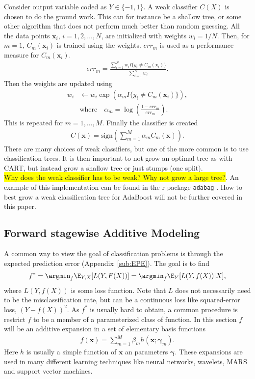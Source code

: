 Consider output variable coded as $Y \in \{-1, 1\}$. A weak classifier $C(X)$ is chosen to do the ground work. This can for instance be a shallow tree, or some other algorithm that does not perform much better than random guessing. All the data points $\mathbf{x}_i$, $i = 1, 2, \ldots, N$, are initialized with weights $w_i = 1/N$. Then, for $m = 1$, $C_m(\mathbf{x}_i)$ is trained using the weights. $err_m$ is used as a performance measure for $C_m(\mathbf{x}_i)$.
\begin{align}
  err_m =  \frac{\sum^{N}_{i=1} w_i I\{y_i \neq C_m(\mathbf{x}_i)\}}{\sum^{N}_{i=1} w_i}.
\end{align}
Then the weights are updated using 
\begin{align}
  w_i &\leftarrow w_i \exp\left( \alpha_m I\{y_i \neq C_m(\mathbf{x}_i)\} \right), \\
  &\text{where} \quad \alpha_m = \log\left(  \frac{1-err_m}{err_m} \right).
\end{align}
This is repeated for $m = 1, \ldots, M$. Finally the classifier is created
\begin{align}
  C( \mathbf{x}) = \text{sign}\left( \sum^{M}_{m=1} \alpha_m C_m(\mathbf{x}) \right).
\end{align}
There are many choices of weak classifiers, but one of the more common is to use classification trees. It is then important to not grow an optimal tree as with CART, but instead grow a shallow tree or just stumps (one split).
\\ \colorbox{yellow}{Why does the weak classifier has to be weak? Why not grow a large tree?}. An example of this implementation can be found in the r package \verb+adabag+ \cite{adabag}. How to best grow a weak classification tree for AdaBoost will not be further covered in this paper.

\subsection{Forward stagewise Additive Modeling}
\label{sub:Forward stagewise additive modeling}
A common way to view the goal of classification problems is through the expected prediction error (Appendix~\ref{sub:EPE}). The goal is to find
\begin{align}
  \label{eq:fargmin} 
  f^* = \argmin_f \E_{Y, X}[L(Y,F(X))] = \argmin_f \E_Y [L(Y,f(X))|X] ,
\end{align}
where $L(Y, f(X))$ is some loss function. Note that $L$ does not necessarily need to be the misclassification rate, but can be a continuous loss like squared-error loss, $(Y - f(X))^2$. As $f^*$ is usually hard to obtain, a common procedure is restrict $f$ to be a member of a parameterized class of function. In this section $f$ will be an additive expansion in a set of elementary basis functions 
\begin{align}
  \label{eq:additive} 
  f(\mathbf{x}) =  \sum^{M}_{m=1} \beta_m h(\mathbf{x}; \bm{\gamma}_m).
\end{align}
Here $h$ is usually a simple function of $\mathbf{x}$ an parameters $\bm{\gamma}$. These expansions are used in many different learning techniques like neural networks, wavelets, MARS and support vector machines.


